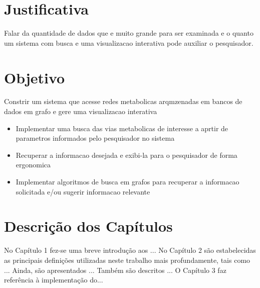 \section{Justificativa}

\indent 

Falar da quantidade de dados que e muito grande para ser examinada e o quanto um sistema com busca e uma visualizacao interativa pode auxiliar o pesquisador.


\section{Objetivo}

\indent 
Constrir um sistema que acesse redes metabolicas arqmzenadas em bancos de dados em grafo e gere uma visualizacao interativa
\begin{itemize}
 \item Implementar uma busca das vias metabolicas de interesse a aprtir de parametros informados pelo pesquisador no sistema
 \item Recuperar a informacao desejada e exibi-la para o pesquisador de forma ergonomica
 \item Implementar algoritmos de busca em grafos para recuperar a informacao solicitada e/ou sugerir informacao relevante
\end{itemize}

\section{Descrição dos Capítulos}

\indent No Capítulo 1 fez-se uma breve introdução aos ... No Capítulo 2 são estabelecidas as principais definições utilizadas neste trabalho mais profundamente, tais 
como ... Ainda, são apresentados ... Também são descritos ... O Capítulo 3 faz referência à implementação do... 






